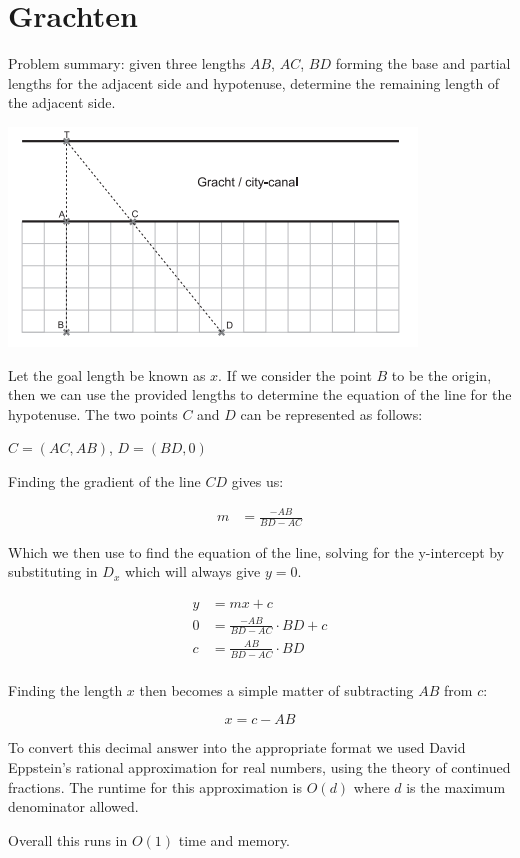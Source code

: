 \section{Grachten}

Problem summary: given three lengths $AB$, $AC$, $BD$ forming the base and partial
lengths for the adjacent side and hypotenuse, determine the remaining length of the
adjacent side.

\begin{center}
\includegraphics[scale=0.75]{f_diagram.png}
\end{center}

Let the goal length be known as $x$. If we consider the point $B$ to be the origin,
then we can use the provided lengths to determine the equation of the line for the
hypotenuse. The two points $C$ and $D$ can be represented as follows: \\

\begin{center}
$C = (AC, AB)$, $D = (BD, 0)$  
\end{center}

Finding the gradient of the line $CD$ gives us: 

$$
\begin{aligned}
m &= \frac{-AB}{BD - AC}
\end{aligned}
$$

Which we then use to find the equation of the line, solving for the y-intercept by
substituting in $D_x$ which will always give $y = 0$.

$$
\begin{aligned}
y &= mx + c \\
0 &= \frac{-AB}{BD - AC} \cdot BD + c \\
c &= \frac{AB}{BD - AC} \cdot BD \\
\end{aligned}
$$

Finding the length $x$ then becomes a simple matter of subtracting $AB$ from $c$:

$$
x = c - AB
$$

To convert this decimal answer into the appropriate format we used David Eppstein's
rational approximation for real numbers, using the theory of continued fractions. 
The runtime for this approximation is $O(d)$ where $d$ is the maximum denominator
allowed.

\vspace{0.5cm}
Overall this runs in $O(1)$ time and memory.
